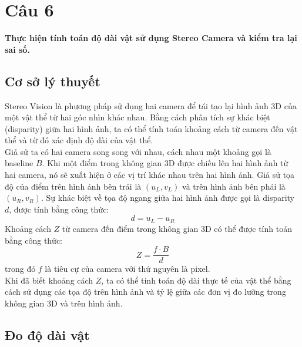 \section{Câu 6}
    \hspace*{0.6cm}\textbf{Thực hiện tính toán độ dài vật sử dụng Stereo Camera và kiểm tra lại sai số.}
    \subsection{Cơ sở lý thuyết}
         \hspace*{0.6cm}Stereo Vision là phương pháp sử dụng hai camera để tái tạo lại hình ảnh 3D của một vật thể từ hai góc nhìn khác nhau. Bằng cách phân tích sự khác biệt (disparity) giữa hai hình ảnh, ta có thể tính toán khoảng cách từ camera đến vật thể và từ đó xác định độ dài của vật thể.\\
         \hspace*{0.6cm}Giả sử ta có hai camera song song với nhau, cách nhau một khoảng gọi là baseline $B$. Khi một điểm trong không gian 3D được chiếu lên hai hình ảnh từ hai camera, nó sẽ xuất hiện ở các vị trí khác nhau trên hai hình ảnh. Giả sử tọa độ của điểm trên hình ảnh bên trái là $(u_L, v_L)$ và trên hình ảnh bên phải là $(u_R, v_R)$. Sự khác biệt về tọa độ ngang giữa hai hình ảnh được gọi là disparity $d$, được tính bằng công thức:
         \begin{equation}
              d = u_L - u_R
         \end{equation}
         \hspace*{0.6cm}Khoảng cách $Z$ từ camera đến điểm trong không gian 3D có thể được tính toán bằng công thức:
         \begin{equation}
              Z = \frac{f \cdot B}{d}
         \end{equation}
         trong đó $f$ là tiêu cự của camera với thứ nguyên là pixel.\\
          \hspace*{0.6cm}Khi đã biết khoảng cách $Z$, ta có thể tính toán độ dài thực tế của vật thể bằng cách sử dụng các tọa độ trên hình ảnh và tỷ lệ giữa các đơn vị đo lường trong không gian 3D và trên hình ảnh.
          
    \subsection{Đo độ dài vật}
